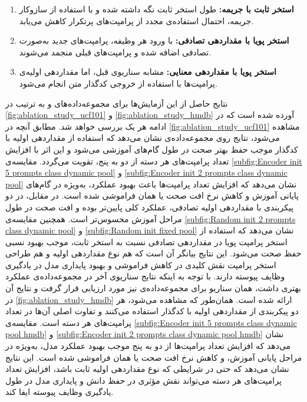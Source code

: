 \begin{enumerate}
	\item \textbf{استخر ثابت با جریمه:} طول استخر ثابت نگه داشته شده و با استفاده از سازوکار جریمه، احتمال استفاده‌ی مجدد از پرامپت‌های پرتکرار کاهش می‌یابد.
	
	\item \textbf{استخر پویا با مقداردهی تصادفی:} با ورود هر وظیفه، پرامپت‌های جدید به‌صورت تصادفی اضافه شده و پرامپت‌های قبلی منجمد می‌شوند.
	
	\item \textbf{استخر پویا با مقداردهی معنایی:} مشابه سناریوی قبل، اما مقداردهی اولیه‌ی پرامپت‌ها با استفاده از خروجی کدگذار متن   انجام می‌شود.
\end{enumerate}
نتایج حاصل از این آزمایش‌ها برای مجموعه‌داده‌های  و  به ترتیب در 
\cref{fig:ablation_study_ucf101}
و
\cref{fig:ablation_study_hmdb}
آورده شده است که در ادامه هر یک بررسی خواهد شد. مطابق آنچه در \cref{fig:ablation_study_ucf101} مشاهده می‌شود، نتایج روی مجموعه‌داده‌ی 
نشان می‌دهد که استفاده از مقداردهی اولیه با کدگذار  موجب حفظ بهتر صحت در طول گام‌های آموزشی می‌شود و این اثر با افزایش تعداد پرامپت‌های هر دسته از دو به پنج، تقویت می‌گردد. مقایسه‌ی \cref{subfig:Encoder init 5 prompts class dynamic pool} و \cref{subfig:Encoder init 2 prompts class dynamic pool} نشان می‌دهد که افزایش تعداد پرامپت‌ها باعث بهبود عملکرد، به‌ویژه در گام‌های پایانی آموزش و کاهش نرخ افت صحت یا همان فراموشی شده است. در مقابل، در دو پیکربندی با مقداردهی اولیه تصادفی، عملکرد کلی پایین‌تر بوده و افت صحت در طول مراحل آموزش محسوس‌تر است. همچنین مقایسه‌ی \cref{subfig:Random init 2 prompts class dynamic pool} و \cref{subfig:Random init fixed pool} نشان می‌دهد که استفاده از استخر پرامپت پویا در مقداردهی تصادفی نسبت به استخر ثابت، موجب بهبود نسبی حفظ صحت می‌شود. این نتایج بیانگر آن است که هم نوع مقداردهی اولیه و هم طراحی استخر پرامپت نقش کلیدی در کاهش فراموشی و بهبود پایداری مدل در یادگیری وظایف پیوسته دارند. با توجه به اینکه نتایج سناریوی آخر در مجموعه‌داده‌ی  عملکرد بهتری داشت، همان سناریو برای مجموعه‌داده‌ی  نیز مورد ارزیابی قرار گرفت و نتایج آن در \cref{fig:ablation_study_hmdb} ارائه شده است. همان‌طور که مشاهده می‌شود، هر دو پیکربندی از مقداردهی اولیه با کدگذار  استفاده می‌کنند و تفاوت اصلی آن‌ها در تعداد پرامپت‌های هر دسته است. مقایسه‌ی \cref{subfig:Encoder init 5 prompts class dynamic pool hmdb} و \cref{subfig:Encoder init 2 prompts class dynamic pool hmdb} نشان می‌دهد که افزایش تعداد پرامپت‌ها از دو به پنج موجب بهبود عملکرد مدل، به‌ویژه در مراحل پایانی آموزش، و کاهش نرخ افت صحت یا همان فراموشی شده است. این نتایج نشان می‌دهد که حتی در شرایطی که نوع مقداردهی اولیه ثابت باشد، افزایش تعداد پرامپت‌های هر دسته می‌تواند نقش مؤثری در حفظ دانش و پایداری مدل در طول یادگیری وظایف پیوسته ایفا کند.
